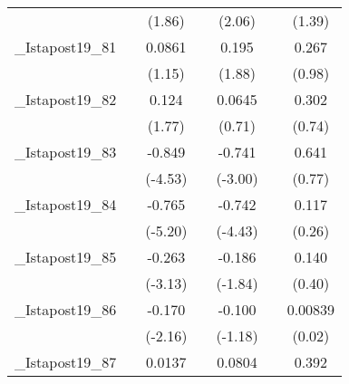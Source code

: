 {\begin{tabular}{l*{6}{c}}
            &                     &      (1.86)         &                     &      (2.06)         &                     &      (1.39)         \\
[1em]
\_Istapost19\_81&                     &      0.0861         &                     &       0.195         &                     &       0.267         \\
            &                     &      (1.15)         &                     &      (1.88)         &                     &      (0.98)         \\
[1em]
\_Istapost19\_82&                     &       0.124         &                     &      0.0645         &                     &       0.302         \\
            &                     &      (1.77)         &                     &      (0.71)         &                     &      (0.74)         \\
[1em]
\_Istapost19\_83&                     &      -0.849\sym{***}&                     &      -0.741\sym{**} &                     &       0.641         \\
            &                     &     (-4.53)         &                     &     (-3.00)         &                     &      (0.77)         \\
[1em]
\_Istapost19\_84&                     &      -0.765\sym{***}&                     &      -0.742\sym{***}&                     &       0.117         \\
            &                     &     (-5.20)         &                     &     (-4.43)         &                     &      (0.26)         \\
[1em]
\_Istapost19\_85&                     &      -0.263\sym{**} &                     &      -0.186         &                     &       0.140         \\
            &                     &     (-3.13)         &                     &     (-1.84)         &                     &      (0.40)         \\
[1em]
\_Istapost19\_86&                     &      -0.170\sym{*}  &                     &      -0.100         &                     &     0.00839         \\
            &                     &     (-2.16)         &                     &     (-1.18)         &                     &      (0.02)         \\
[1em]
\_Istapost19\_87&                     &      0.0137         &                     &      0.0804         &                     &       0.392         \\

\end{tabular}}
